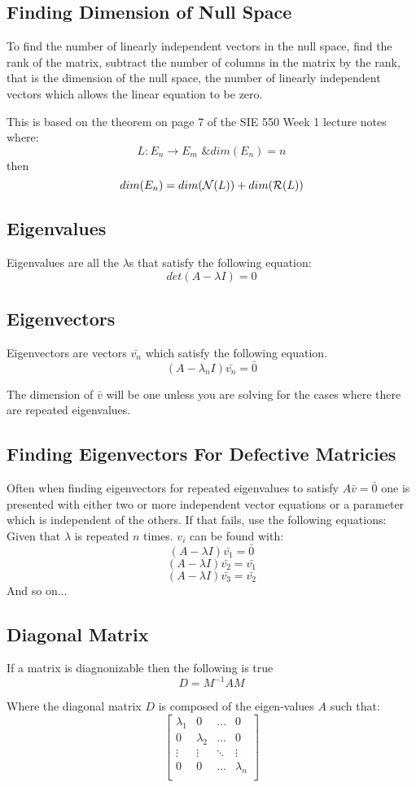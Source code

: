 \documentclass[12pt]{article}
\begin{document}
\subsection*{Finding Dimension of Null Space}
To find the number of linearly independent vectors in the null space, find the rank of the matrix, subtract the number of columns in the matrix by the rank, that is the dimension of the null space, the number of linearly independent vectors which allows the linear equation to be zero.

This is based on the theorem on page 7 of the SIE 550 Week 1 lecture notes where:
$$L:E_n \rightarrow E_m \text{ \& } dim(E_n)=n$$
then 
$$dim(E_n)=dim({\cal N}(L))+dim({\cal R}(L))$$

\subsection*{Eigenvalues}
Eigenvalues are all the $\lambda$s that satisfy the following equation:
$$det(A-\lambda I)=0$$

\subsection*{Eigenvectors}
Eigenvectors are vectors $\bar{v_n}$ which satisfy the following equation. 
$$(A-\lambda_n I)\bar{v_n}=\bar{0}$$

\noindent
The dimension of $\bar{v}$ will be one unless you are solving for the cases where there are repeated eigenvalues.

\subsection*{Finding Eigenvectors For Defective Matricies}
Often when finding eigenvectors for repeated eigenvalues to satisfy $A\bar{v}=\bar{0}$ one is presented with either two or more independent vector equations or a parameter which is independent of the others. If that fails, use the following equations:
Given that $\lambda$ is repeated $n$ times. $v_i$ can be found with:
$$(A-\lambda I)\bar{v_1}=\bar{0}$$
$$(A-\lambda I)\bar{v_2}=\bar{v_1}$$
$$(A-\lambda I)\bar{v_3}=\bar{v_2}$$
And so on...

\subsection*{Diagonal Matrix}
If a matrix is diagnonizable then the following is true
$$
D=M^{-1}AM
$$

\noindent
Where the diagonal matrix $D$ is composed of the eigen-values $A$ such that:
$$
\begin{bmatrix}
	\lambda_1 & 0 & \dots & 0 \\
	0 & \lambda_2 & \dots & 0 \\
	\vdots & \vdots & \ddots & \vdots \\
	0 & 0 & \dots & \lambda_n \\
\end{bmatrix}
$$
\end{document}
